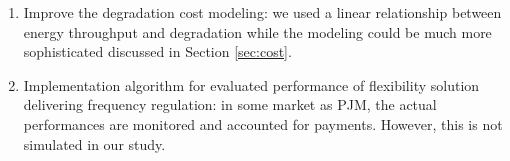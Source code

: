 \begin{enumerate}
	\item Improve the degradation cost modeling: we used a linear relationship between energy throughput and degradation while the modeling could be much more sophisticated discussed in Section \ref{sec:cost}.
	\item Implementation algorithm for evaluated performance of flexibility solution delivering frequency regulation: in some market as PJM, the actual performances are monitored and accounted for payments. However, this is not simulated in our study.
\end{enumerate}


